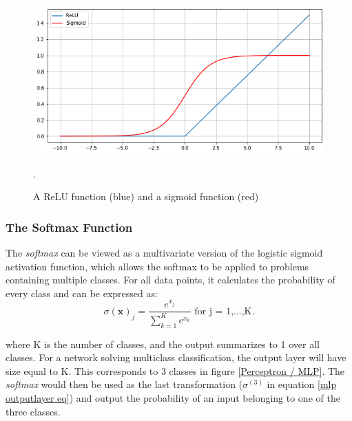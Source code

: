             \begin{figure}[H]
                \centering
                \includegraphics[scale=0.5]{figures/activation.png}
                \caption[ReLu and sigmoid]{A ReLU function (blue) and a sigmoid function (red)}.
              	\medskip 
                \label{activation_fig}
            \end{figure}

    \subsubsection{The Softmax Function}
        The \textit{softmax} can be viewed as a multivariate version of the logistic sigmoid activation function, which allows the softmax to be applied to problems containing multiple classes\cite{sharma2019new_activation_func}. For all data points, it calculates the probability of every class and can be expressed as:
        \begin{equation}
            \sigma(\textbf{x})_{j} = \dfrac{e^{x_{j}}}{\sum^{K}_{k=1}e^{x_{k}}} \textrm{ for j = 1,...,K.}
        \end{equation}
        
        where K is the number of classes, and the output summarizes to 1 over all classes. For a network solving multiclass classification, the output layer will have size equal to K. This corresponds to 3 classes in figure \ref{Perceptron / MLP}. The \textit{softmax} would then be used as the last transformation ($\sigma^{(3)}$ in equation \ref{mlp outputlayer eq}) and output the probability of an input belonging to one of the three classes.
        

